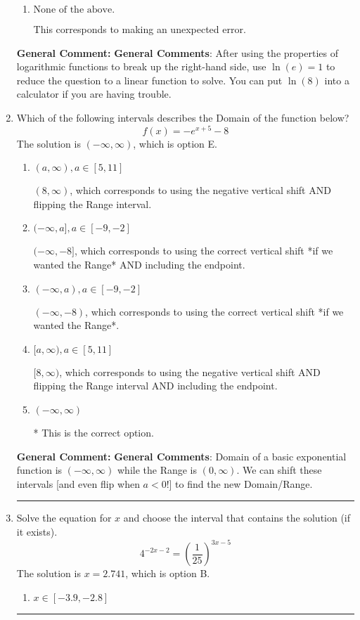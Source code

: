 \documentclass{extbook}[14pt]
\newcommand{\litem}[1]{\item #1

\rule{\textwidth}{0.4pt}}
\begin{document}
\begin{enumerate}
{\begin{enumerate}[label=\Alph*.]
This corresponds to believing you cannot solve the equation.
\item \( \text{None of the above.} \)

This corresponds to making an unexpected error.
\end{enumerate}

\textbf{General Comment:} \textbf{General Comments}: After using the properties of logarithmic functions to break up the right-hand side, use $\ln(e) = 1$ to reduce the question to a linear function to solve. You can put $\ln(8)$ into a calculator if you are having trouble.
}
\litem{
Which of the following intervals describes the Domain of the function below?
\[ f(x) = -e^{x+5}-8 \]
The solution is \( (-\infty, \infty) \), which is option E.\begin{enumerate}[label=\Alph*.]
\item \( (a, \infty), a \in [5, 11] \)

$(8, \infty)$, which corresponds to using the negative vertical shift AND flipping the Range interval.
\item \( (-\infty, a], a \in [-9, -2] \)

$(-\infty, -8]$, which corresponds to using the correct vertical shift *if we wanted the Range* AND including the endpoint.
\item \( (-\infty, a), a \in [-9, -2] \)

$(-\infty, -8)$, which corresponds to using the correct vertical shift *if we wanted the Range*.
\item \( [a, \infty), a \in [5, 11] \)

$[8, \infty)$, which corresponds to using the negative vertical shift AND flipping the Range interval AND including the endpoint.
\item \( (-\infty, \infty) \)

* This is the correct option.
\end{enumerate}

\textbf{General Comment:} \textbf{General Comments}: Domain of a basic exponential function is $(-\infty, \infty)$ while the Range is $(0, \infty)$. We can shift these intervals [and even flip when $a<0$!] to find the new Domain/Range.
}
\litem{
Solve the equation for $x$ and choose the interval that contains the solution (if it exists).
\[ 4^{-2x-2} = \left(\frac{1}{25}\right)^{3x-5} \]
The solution is \( x = 2.741 \), which is option B.\begin{enumerate}[label=\Alph*.]
\item \( x \in [-3.9, -2.8] \)


\end{enumerate}}
\end{enumerate}
\end{document}
